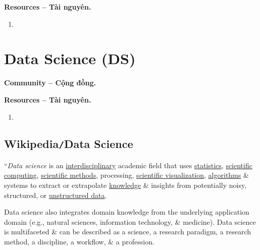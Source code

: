 \documentclass{article}
\begin{document}
\noindent\textbf{\textsf{Resources -- Tài nguyên.}}
\begin{enumerate}
	\item 
\end{enumerate}


\section{Data Science (DS)}
\textbf{\textsf{Community -- Cộng đồng.}} 

\noindent\textbf{\textsf{Resources -- Tài nguyên.}}
\begin{enumerate}
	\item 
\end{enumerate}

\subsection{Wikipedia{\tt/}Data Science}
``{\it Data science} is an \href{https://en.wikipedia.org/wiki/Interdisciplinary}{interdisciplinary} academic field that uses \href{https://en.wikipedia.org/wiki/Statistics}{statistics}, \href{https://en.wikipedia.org/wiki/Scientific_computing}{scientific computing}, \href{https://en.wikipedia.org/wiki/Scientific_method}{scientific methods}, processing, \href{https://en.wikipedia.org/wiki/Scientific_visualization}{scientific visualization}, \href{https://en.wikipedia.org/wiki/Algorithm}{algorithms} \& systems to extract or extrapolate \href{https://en.wikipedia.org/wiki/Knowledge}{knowledge} \& insights from potentially noisy, structured, or \href{https://en.wikipedia.org/wiki/Unstructured_data}{unstructured data}.

Data science also integrates domain knowledge from the underlying application domain (e.g., natural sciences, information technology, \& medicine). Data science is multifaceted \& can be described as a science, a research paradigm, a research method, a discipline, a workflow, \& a profession.
\end{document}
